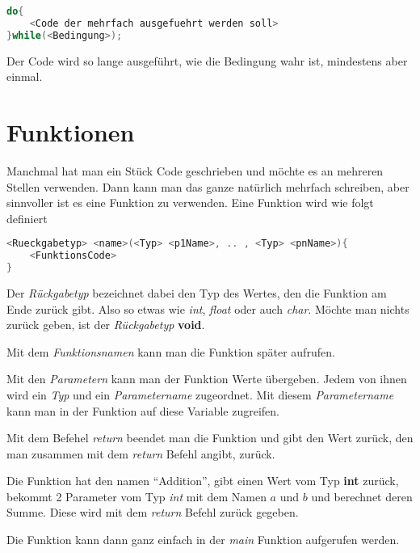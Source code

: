 \documentclass[c_worksheet.tex]{subfiles}
\begin{document}
\begin{lstlisting}[language=c]
do{
 	<Code der mehrfach ausgefuehrt werden soll>
}while(<Bedingung>);
\end{lstlisting} 

Der Code wird so lange ausgeführt, wie die Bedingung wahr ist, mindestens aber einmal.





\section{Funktionen}

Manchmal hat man ein Stück Code geschrieben und möchte es an mehreren Stellen verwenden. Dann kann man das ganze natürlich mehrfach schreiben, aber sinnvoller ist es eine Funktion zu verwenden. Eine Funktion wird wie folgt definiert

\begin{lstlisting}[language=c]
<Rueckgabetyp> <name>(<Typ> <p1Name>, .. , <Typ> <pnName>){
	<FunktionsCode>
}
\end{lstlisting}

Der \emph{Rückgabetyp} bezeichnet dabei den Typ des Wertes, den die Funktion am Ende zurück gibt. Also so etwas wie \emph{int}, \emph{float} oder auch \emph{char}. Möchte man nichts zurück geben, ist der \emph{Rückgabetyp} \textbf{void}.

Mit dem \emph{Funktionsnamen} kann man die Funktion später aufrufen.

Mit den \emph{Parametern} kann man der Funktion Werte übergeben. Jedem von ihnen wird ein \emph{Typ} und ein \emph{Parametername} zugeordnet. Mit diesem \emph{Parametername} kann man in der Funktion auf diese Variable zugreifen.

Mit dem Befehel \emph{return} beendet man die Funktion und gibt den Wert zurück, den man zusammen mit dem \emph{return} Befehl angibt, zurück.


 

Die Funktion hat den namen ``Addition'', gibt einen Wert vom Typ \textbf{int} zurück, bekommt 2 Parameter vom Typ \emph{int} mit dem Namen \(a\) und \(b\) und berechnet deren Summe. Diese wird mit dem \emph{return} Befehl zurück gegeben.

Die Funktion kann dann ganz einfach in der \emph{main} Funktion aufgerufen werden.
\end{document}
